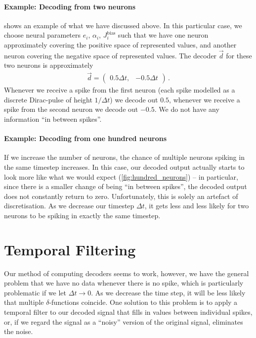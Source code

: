 \documentclass[10pt,letterpaper,oneside]{article}
\begin{document}
\paragraph{Example: Decoding from two neurons}
 shows an example of what we have discussed above. In this particular case, we choose neural parameters $e_i$, $\alpha_i$, $J^\mathrm{bias}_i$ such that we have one neuron approximately covering the positive space of represented values, and another neuron covering the negative space of represented values. The decoder $\vec d$ for these two neurons is approximately
\begin{align*}
	\vec d = \begin{pmatrix} 0.5 \Delta t, & -0.5 \Delta t \end{pmatrix} \,.
\end{align*}
Whenever we receive a spike from the first neuron (each spike modelled as a discrete Dirac-pulse of height $1/\Delta t$) we decode out $0.5$, whenever we receive a spike from the second neuron we decode out $-0.5$. We do not have any information \enquote{in between spikes}.

\paragraph{Example: Decoding from one hundred neurons}
If we increase the number of neurons, the chance of multiple neurons spiking in the same timestep increases. In this case, our decoded output actually starts to look more like what we would expect (\cref{fig:hundred_neurons}) -- in particular, since there is a smaller change of being \enquote{in between spikes}, the decoded output does not constantly return to zero. Unfortunately, this is solely an artefact of discretisation. As we decrease our timestep $\Delta t$, it gets less and less likely for two neurons to be spiking in exactly the same timestep.


\section{Temporal Filtering}

Our method of computing decoders seems to work, however, we have the general problem that we have no data whenever there is no spike, which is particularly problematic if we let $\Delta t \to 0$. As we decrease the time step, it will be less likely that multiple $\delta$-functions coincide. One solution to this problem is to apply a temporal filter to our decoded signal that fills in values between individual spikes, or, if we regard the signal as a \enquote{noisy} version of the original signal, eliminates the noise.
\end{document}
